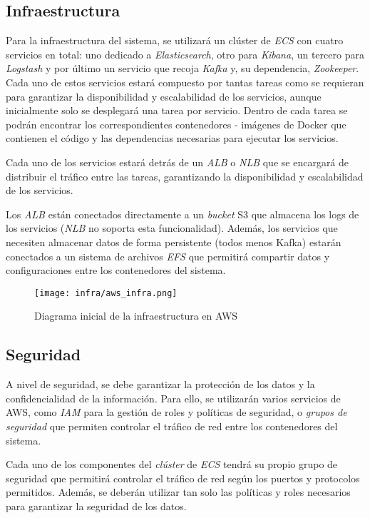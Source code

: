 \newpage{}
\subsection{Infraestructura}\label{subsec:infra}
Para la infraestructura del sistema, se utilizará un clúster de \textit{ECS} con
cuatro servicios en total: uno dedicado a \textit{Elasticsearch}, otro para
\textit{Kibana}, un tercero para \textit{Logstash} y por último un servicio que
recoja \textit{Kafka} y, su dependencia, \textit{Zookeeper}. Cada uno de estos
servicios estará compuesto por tantas tareas como se requieran para garantizar
la disponibilidad y escalabilidad de los servicios, aunque inicialmente solo se
desplegará una tarea por servicio. Dentro de cada tarea se podrán encontrar los
correspondientes contenedores - imágenes de Docker que contienen el código y las
dependencias necesarias para ejecutar los servicios.

Cada uno de los servicios estará detrás de un \textit{ALB} o \textit{NLB} que se
encargará de distribuir el tráfico entre las tareas, garantizando la
disponibilidad y escalabilidad de los servicios.

Los \textit{ALB} están conectados directamente a un \textit{bucket} S3 que
almacena los logs de los servicios (\textit{NLB} no soporta esta funcionalidad).
Además, los servicios que necesiten almacenar datos de forma persistente (todos
menos Kafka) estarán conectados a un sistema de archivos \textit{EFS} que
permitirá compartir datos y configuraciones entre los contenedores del sistema.

\begin{figure}[H]
	\centerline{\texttt{[image: infra/aws\_infra.png]}}
	\caption{Diagrama inicial de la infraestructura en AWS}

	\label{fig:aws_infra}
\end{figure}


\subsection{Seguridad}\label{subsec:seguridad}
A nivel de seguridad, se debe garantizar la protección de los datos y la
confidencialidad de la información. Para ello, se utilizarán varios servicios de
AWS, como \textit{IAM} para la gestión de roles y políticas de seguridad, o
\textit{grupos de seguridad} que permiten controlar el tráfico de red entre los
contenedores del sistema.

Cada uno de los componentes del \textit{clúster} de \textit{ECS} tendrá su
propio grupo de seguridad que permitirá controlar el tráfico de red según los
puertos y protocolos permitidos. Además, se deberán utilizar tan solo las
políticas y roles necesarios para garantizar la seguridad de los datos.


